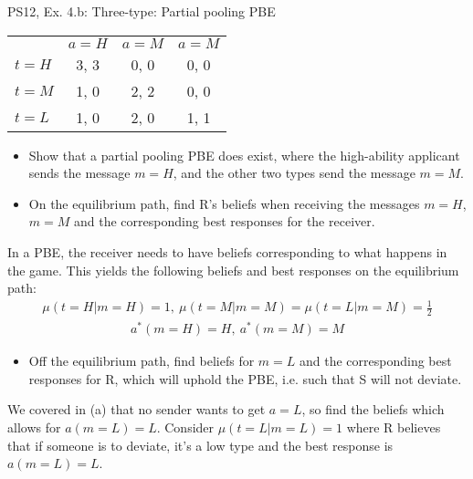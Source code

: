 \begin{frame}{PS12, Ex. 4.b: Three-type: Partial pooling PBE}
    \begin{table}
      \begin{tabular}{l|c|c|c|}
          \multicolumn{1}{c}{} & \multicolumn{1}{c}{$a=H$} & \multicolumn{1}{c}{$a=M$} & \multicolumn{1}{c}{$a=M$} \\\cline{2-4}
          $t=H$ & 3, 3 & 0, 0 & 0, 0 \\\cline{2-4}
          $t=M$ & 1, 0 & 2, 2 & 0, 0 \\\cline{2-4}
          $t=L$ & 1, 0 & 2, 0 & 1, 1 \\\cline{2-4}
      \end{tabular}
    \end{table}\vspace{-8pt}
    \begin{itemize}
      \item[(b)] Show that a partial pooling PBE does exist, where the high-ability applicant sends the message $m = H$, and the other two types send the message $m = M$.
      \item[Step 1:] On the equilibrium path, find R's beliefs when receiving the messages $m=H$, $m=M$ and the corresponding best responses for the receiver.
    \end{itemize}\vspace{-6pt}
    In a PBE, the receiver needs to have beliefs corresponding to what happens in the game. This yields the following beliefs and best responses on the equilibrium path:\vspace{-2pt}
    \begin{align*}
        \mu(t=H|m=H)=1,\
        \mu(t=M|m=M)=\mu(t=L|m=M)=\frac{1}{2}
    \end{align*}\vspace{-18pt}
    \begin{align*}
        a^*(m=H)=H,\ a^*(m=M)=M
    \end{align*}\vspace{-18pt}
    \begin{itemize}
      \item[Step 2:] Off the equilibrium path, find beliefs for $m=L$ and the corresponding best responses for R, which will uphold the PBE, i.e. such that S will not deviate.
    \end{itemize}\vspace{-6pt}
    We covered in (a) that no sender wants to get $a=L$, so find the beliefs which allows for $a(m=L)=L$. Consider $\mu(t=L|m=L)=1$ where R believes that if someone is to deviate, it's a low type and the best response is $a(m=L)=L$.\vspace{-2pt}
    \vfill\null
\end{frame}
